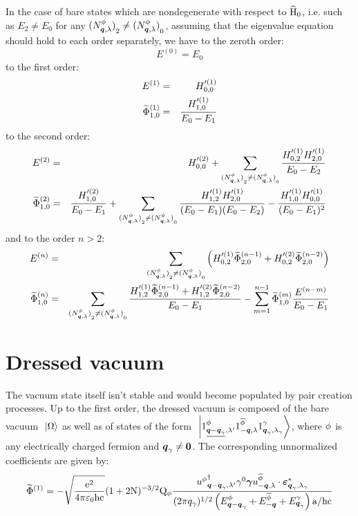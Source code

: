In the case of bare states which are nondegenerate with respect to $\widehat{\mathrm H}_0$, i.e. such as $E_2 \neq E_0$ for any ${({N}^{\phi}_{{\boldsymbol{q}}, {\lambda}})}_2 \neq {({N}^{\phi}_{{\boldsymbol{q}}, {\lambda}})}_0$, assuming that the eigenvalue equation should hold to each order separately, we have to the zeroth order:
\begin{equation*}
E^{(0)} = E_0
\end{equation*}
to the first order:
\begin{eqnarray*}
E^{(1)} & = & H'^{(1)}_{0,0} \\
\widetilde{\Phi}_{1,0}^{(1)} & = & \frac{H'^{(1)}_{1,0}}{E_0 - E_1}
\end{eqnarray*}
to the second order:
\begin{eqnarray*}
E^{(2)} & = & H'^{(2)}_{0,0} + \sum_{{({N}^{\phi}_{{\boldsymbol{q}}, {\lambda}})}_2 \neq {({N}^{\phi}_{{\boldsymbol{q}}, {\lambda}})}_0} \frac{H'^{(1)}_{0,2} H'^{(1)}_{2,0}}{E_0 - E_2} \\
\widetilde{\Phi}_{1,0}^{(2)} & = & \frac{H'^{(2)}_{1,0}}{E_0 - E_1} + \sum_{{({N}^{\phi}_{{\boldsymbol{q}}, {\lambda}})}_2 \neq {({N}^{\phi}_{{\boldsymbol{q}}, {\lambda}})}_0} \frac{H'^{(1)}_{1,2} H'^{(1)}_{2,0}}{( E_0 - E_1 ) ( E_0 - E_2 )} - \frac{H'^{(1)}_{1,0} H'^{(1)}_{0,0}}{( E_0 - E_1 )^2}
\end{eqnarray*}
and to the order $n > 2$:
\begin{eqnarray*}
E^{(n)} & = & \sum_{{({N}^{\phi}_{{\boldsymbol{q}}, {\lambda}})}_2 \neq {({N}^{\phi}_{{\boldsymbol{q}}, {\lambda}})}_0} \left( H'^{(1)}_{0,2} \widetilde{\Phi}_{2,0}^{(n - 1)} + H'^{(2)}_{0,2} \widetilde{\Phi}_{2,0}^{(n - 2)} \right) \\
\widetilde{\Phi}_{1,0}^{(n)} & = & \sum_{{({N}^{\phi}_{{\boldsymbol{q}}, {\lambda}})}_2 \neq {({N}^{\phi}_{{\boldsymbol{q}}, {\lambda}})}_0} \frac{H'^{(1)}_{1,2} \widetilde{\Phi}_{2,0}^{(n - 1)} + H'^{(2)}_{1,2} \widetilde{\Phi}_{2,0}^{(n - 2)}}{E_0 - E_1} - \sum_{m = 1}^{n - 1} \widetilde{\Phi}_{1,0}^{(m)} \frac{E^{(n - m)}}{E_0 - E_1}
\end{eqnarray*}


\section{Dressed vacuum}

The vacuum state itself isn't stable and would become populated by pair creation processes. Up to the first order, the dressed vacuum is composed of the bare vacuum $\ \left|{\Omega}\right\rangle$ as well as of states of the form $\ \left|{{1}^{\phi}_{{\underline{\boldsymbol{q}-\boldsymbol{q}_\gamma}}, {\lambda'}} {1}^{\overline{\phi}}_{{-\boldsymbol{q}}, {\lambda}} {1}^{\gamma}_{{\boldsymbol{q}_\gamma}, {\lambda_\gamma}}}\right\rangle$, where $\phi$ is any electrically charged fermion and $\boldsymbol{q}_\gamma \neq \boldsymbol{0}$. The corresponding unnormalized coefficients  are given by:
\begin{equation*}
\widetilde{\Phi}^{(1)} = - \sqrt{\frac{\mathrm e^2}{4 \pi \mathrm \varepsilon_0 \mathrm h \mathrm c}} ( 1 + 2 \mathrm N )^{-3/2} \mathrm Q_{\phi} \frac{{u^{\phi}}^{\dagger}_{{\boldsymbol{q} - \boldsymbol{q}_\gamma}, {\lambda'}} \gamma^{0} \boldsymbol{\gamma} u^{\overline{\phi}}_{{-\boldsymbol{q}}, {\lambda}} \cdot \boldsymbol{\varepsilon}_{{\boldsymbol{q}_\gamma},{\lambda_\gamma}}^*}{( 2 \pi q_\gamma )^{1 / 2} \left( E^{\phi}_{\boldsymbol{q} - \boldsymbol{q}_\gamma} + E^{\overline{\phi}}_{-\boldsymbol{q}} + E^{\gamma}_{\boldsymbol{q}_\gamma} \right) \mathrm a / \mathrm h \mathrm c}
\end{equation*}


